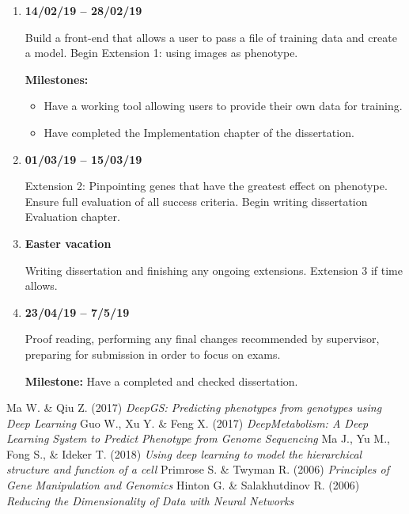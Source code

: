 \documentclass[12pt,a4paper,twoside,openany]{article}
\begin{document}
\begin{enumerate}
\item \textbf{14/02/19 -- 28/02/19} 

Build a front-end that allows a user to pass a file of training data and create a model. Begin Extension 1: using images as phenotype.

\textbf{Milestones:}
\begin{itemize}
    \item Have a working tool allowing users to provide their own data for training.
    \item Have completed the Implementation chapter of the dissertation.
\end{itemize}

\item \textbf{01/03/19 -- 15/03/19} 

Extension 2: Pinpointing genes that have the greatest effect on phenotype.
Ensure full evaluation of all success criteria. Begin writing dissertation Evaluation chapter.

\item \textbf{Easter vacation}  

Writing dissertation and finishing any ongoing extensions. Extension 3 if time allows.

\item \textbf{23/04/19 -- 7/5/19} 

Proof reading, performing any final changes recommended by supervisor, preparing for submission in order to focus on exams.

\textbf{Milestone:} Have a completed and checked dissertation.

\end{enumerate}

\begin{thebibliography}{}
Ma W. \& Qiu Z. (2017) \textit{DeepGS: Predicting phenotypes from genotypes using Deep Learning}
Guo W., Xu Y. \& Feng X. (2017) \textit{DeepMetabolism: A Deep Learning System to Predict Phenotype from Genome Sequencing}
Ma J., Yu M., Fong S., \& Ideker T. (2018) \textit{Using deep learning to model the hierarchical structure and function of a cell}
Primrose S. \& Twyman R. (2006) \textit{Principles of Gene Manipulation and Genomics}
Hinton G. \& Salakhutdinov R. (2006) \textit{Reducing the Dimensionality of Data with Neural Networks}

\end{thebibliography}
\end{document}
